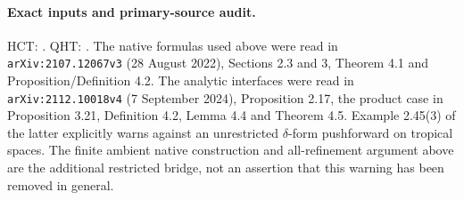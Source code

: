 \paragraph{Exact inputs and primary-source audit.}
HCT:
.
QHT:
.
The native formulas used above were read in
\texttt{arXiv:2107.12067v3} (28 August 2022), Sections 2.3 and 3,
Theorem 4.1 and Proposition/Definition 4.2.  The analytic interfaces
were read in \texttt{arXiv:2112.10018v4} (7 September 2024),
Proposition 2.17, the product case in Proposition 3.21,
Definition 4.2, Lemma 4.4 and Theorem 4.5.  Example 2.45(3)
of the latter explicitly warns against an unrestricted
$\delta$-form pushforward on tropical spaces.  The finite ambient
native construction and all-refinement argument above are the
additional restricted bridge, not an assertion that this warning
has been removed in general.
